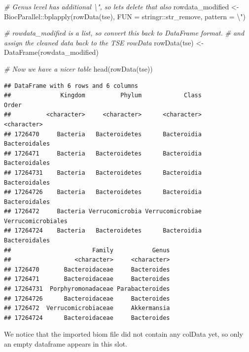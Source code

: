 \documentclass[
]{book}
\newenvironment{Shaded}{\begin{snugshade}}{\end{snugshade}}
\newcommand{\AttributeTok}[1]{\textcolor[rgb]{0.77,0.63,0.00}{#1}}
\newcommand{\CommentTok}[1]{\textcolor[rgb]{0.56,0.35,0.01}{\textit{#1}}}
\newcommand{\FunctionTok}[1]{\textcolor[rgb]{0.00,0.00,0.00}{#1}}
\newcommand{\NormalTok}[1]{#1}
\newcommand{\OtherTok}[1]{\textcolor[rgb]{0.56,0.35,0.01}{#1}}
\newcommand{\SpecialCharTok}[1]{\textcolor[rgb]{0.00,0.00,0.00}{#1}}
\newcommand{\StringTok}[1]{\textcolor[rgb]{0.31,0.60,0.02}{#1}}
\begin{document}
\begin{Shaded}
\begin{Highlighting}[]
\CommentTok{\# Genus level has additional \textquotesingle{}\textbackslash{}"\textquotesingle{}, so let\textquotesingle{}s delete that also}
\NormalTok{rowdata\_modified }\OtherTok{\textless{}{-}}\NormalTok{ BiocParallel}\SpecialCharTok{::}\FunctionTok{bplapply}\NormalTok{(}\FunctionTok{rowData}\NormalTok{(tse), }
                                           \AttributeTok{FUN =}\NormalTok{ stringr}\SpecialCharTok{::}\NormalTok{str\_remove, }
                                           \AttributeTok{pattern =} \StringTok{\textquotesingle{}}\SpecialCharTok{\textbackslash{}"}\StringTok{\textquotesingle{}}\NormalTok{)}

\CommentTok{\# rowdata\_modified is a list, so convert this back to DataFrame format. }
\CommentTok{\# and assign the cleaned data back to the TSE rowData}
\FunctionTok{rowData}\NormalTok{(tse) }\OtherTok{\textless{}{-}} \FunctionTok{DataFrame}\NormalTok{(rowdata\_modified)}

\CommentTok{\# Now we have a nicer table}
\FunctionTok{head}\NormalTok{(}\FunctionTok{rowData}\NormalTok{(tse))}
\end{Highlighting}
\end{Shaded}

\begin{verbatim}
## DataFrame with 6 rows and 6 columns
##              Kingdom          Phylum            Class              Order
##          <character>     <character>      <character>        <character>
## 1726470     Bacteria   Bacteroidetes      Bacteroidia      Bacteroidales
## 1726471     Bacteria   Bacteroidetes      Bacteroidia      Bacteroidales
## 17264731    Bacteria   Bacteroidetes      Bacteroidia      Bacteroidales
## 17264726    Bacteria   Bacteroidetes      Bacteroidia      Bacteroidales
## 1726472     Bacteria Verrucomicrobia Verrucomicrobiae Verrucomicrobiales
## 17264724    Bacteria   Bacteroidetes      Bacteroidia      Bacteroidales
##                       Family           Genus
##                  <character>     <character>
## 1726470       Bacteroidaceae     Bacteroides
## 1726471       Bacteroidaceae     Bacteroides
## 17264731  Porphyromonadaceae Parabacteroides
## 17264726      Bacteroidaceae     Bacteroides
## 1726472  Verrucomicrobiaceae     Akkermansia
## 17264724      Bacteroidaceae     Bacteroides
\end{verbatim}

We notice that the imported biom file did not contain any colData yet,
so only an empty dataframe appears in this slot.
\end{document}
